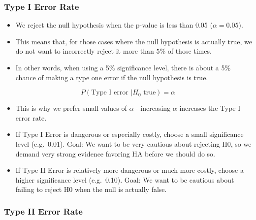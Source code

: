 \documentclass[]{book}
\providecommand{\tightlist}{%
  \setlength{\itemsep}{0pt}\setlength{\parskip}{0pt}}
\begin{document}
\hypertarget{type-i-error-rate}{%
\subsubsection*{Type I Error Rate}\label{type-i-error-rate}}

\begin{itemize}
\tightlist
\item
  We reject the null hypothesis when the p-value is less than 0.05 (\(\alpha = 0.05\)).
\item
  This means that, for those cases where the null hypothesis is actually true, we do not want to incorrectly reject it more than 5\% of those times.
\item
  In other words, when using a 5\% significance level, there is about a 5\% chance of making a type one error if the null hypothesis is true.
\end{itemize}

\[ P(\text{Type I error } | H_0 \text{ true}) = \alpha \]

\begin{itemize}
\tightlist
\item
  This is why we prefer small values of \(\alpha\) - increasing \(\alpha\) increases the Type I error rate.
\item
  If Type I Error is dangerous or especially costly, choose a small significance level (e.g.~0.01). Goal: We want to be very cautious about rejecting H0, so we demand very strong evidence favoring HA before we should do so.
\item
  If Type II Error is relatively more dangerous or much more costly, choose a higher significance level (e.g.~0.10). Goal: We want to be cautious about failing to reject H0 when the null is actually false.
\end{itemize}

\hypertarget{type-ii-error-rate}{%
\subsubsection*{Type II Error Rate}\label{type-ii-error-rate}}
\end{document}
